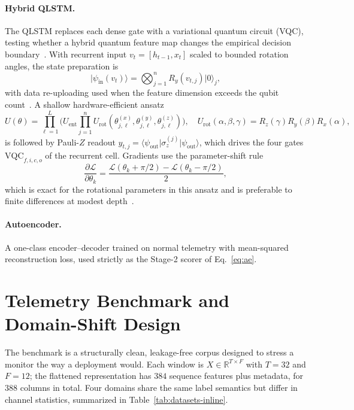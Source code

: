 \documentclass[runningheads]{llncs}
\begin{document}
\paragraph{Hybrid QLSTM.}
The QLSTM replaces each dense gate with a variational quantum circuit (VQC), testing whether a hybrid quantum feature map changes the empirical decision boundary~\cite{qlstm,chen,bergholm2018pennylane}. With recurrent input $v_t=[h_{t-1},x_t]$ scaled to bounded rotation angles, the state preparation is
\begin{equation}
\lvert\psi_{\mathrm{in}}(v_t)\rangle=\bigotimes_{j=1}^{n}R_y(v_{t,j})\lvert 0\rangle_j ,
\end{equation}
with data re-uploading used when the feature dimension exceeds the qubit count~\cite{data_reuploading}. A shallow hardware-efficient ansatz
\begin{equation}
U(\theta)=\prod_{\ell=1}^{L}\Big(U_{\mathrm{ent}}\textstyle\prod_{j=1}^{n}U_{\mathrm{rot}}(\theta^{(x)}_{j,\ell},\theta^{(y)}_{j,\ell},\theta^{(z)}_{j,\ell})\Big),\quad U_{\mathrm{rot}}(\alpha,\beta,\gamma)=R_z(\gamma)R_y(\beta)R_x(\alpha),
\end{equation}
is followed by Pauli-$Z$ readout $y_{t,j}=\langle\psi_{\mathrm{out}}\lvert\sigma_z^{(j)}\rvert\psi_{\mathrm{out}}\rangle$, which drives the four gates $\mathrm{VQC}_{f,i,c,o}$ of the recurrent cell. Gradients use the parameter-shift rule
\begin{equation}
\frac{\partial\mathcal{L}}{\partial\theta_k}=\frac{\mathcal{L}(\theta_k+\pi/2)-\mathcal{L}(\theta_k-\pi/2)}{2},
\end{equation}
which is exact for the rotational parameters in this ansatz and is preferable to finite differences at modest depth~\cite{mcclean2018barren,cerezo2021variational}.

\paragraph{Autoencoder.}
A one-class encoder--decoder trained on normal telemetry with mean-squared reconstruction loss, used strictly as the Stage-2 scorer of Eq.~\eqref{eq:ae}.

\section{Telemetry Benchmark and Domain-Shift Design}\label{sec:benchmark}
The benchmark is a structurally clean, leakage-free corpus designed to stress a monitor the way a deployment would. Each window is $X\in\mathbb{R}^{T\times F}$ with $T=32$ and $F=12$; the flattened representation has $384$ sequence features plus metadata, for $388$ columns in total. Four domains share the same label semantics but differ in channel statistics, summarized in Table~\ref{tab:datasets-inline}.
\end{document}
